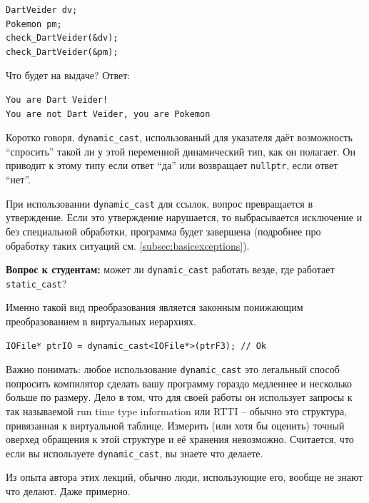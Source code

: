 \documentclass[a4paper,12pt,oneside]{article}
\newif\ifanswers
\begin{document}
\begin{lstlisting}
DartVeider dv;
Pokemon pm;
check_DartVeider(&dv);
check_DartVeider(&pm);
\end{lstlisting}

Что будет на выдаче? Ответ:

\begin{verbatim}
You are Dart Veider!
You are not Dart Veider, you are Pokemon
\end{verbatim}

Коротко говоря, \lstinline!dynamic_cast!, использованый для указателя даёт возможность ``спросить'' такой ли у этой переменной динамический тип, как он полагает. Он приводит к этому типу если ответ ``да'' или возвращает \lstinline!nullptr!, если ответ ``нет''.

При использовании \lstinline!dynamic_cast! для ссылок, вопрос превращается в утверждение. Если это утверждение нарушается, то выбрасывается исключение и без специальной обработки, программа будет завершена (подробнее про обработку таких ситуаций см. \ref{subsec:basicexceptions}).

\textbf{Вопрос к студентам:} может ли \lstinline!dynamic_cast! работать везде, где работает \lstinline!static_cast!?

\ifanswers
Правильный ответ: нет \lstinline!dynamic_cast! очень важно, чтобы в базовом классе была хотя бы одна виртуальная функция -- если таблицы виртуальных методов не будет существовать, динамическое приведение не будет работать.
\fi

Именно такой вид преобразования является законным понижающим преобразованием в виртуальных иерархиях.

\begin{lstlisting}
IOFile* ptrIO = dynamic_cast<IOFile*>(ptrF3); // Ok
\end{lstlisting}

Важно понимать: любое использование \lstinline!dynamic_cast! это легальный способ попросить компилятор сделать вашу программу гораздо медленнее и несколько больше по размеру. Дело в том, что для своей работы он использует запросы к так называемой run time type information или RTTI -- обычно это структура, привязанная к виртуальной таблице. Измерить (или хотя бы оценить) точный оверхед обращения к этой структуре и её хранения невозможно. Считается, что если вы используете \lstinline!dynamic_cast!, вы знаете что делаете.

Из опыта автора этих лекций, обычно люди, использующие его, вообще не знают что делают. Даже примерно.
\end{document}
